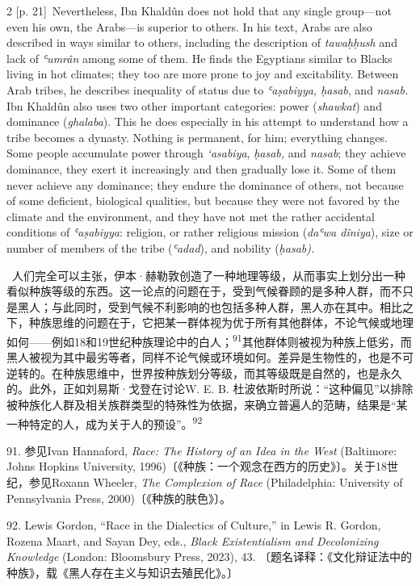 \documentclass[10pt,a4paper]{article}
\begin{document}
\begin{paracol}{2}
\switchcolumn
{\scriptsize\color{gray} [p. 21]}\ Nevertheless, Ibn Khaldûn does not hold that any single group—not even his own, the Arabs—is superior to others. In his text, Arabs are also described in ways similar to others, including the description of \textit{tawaḥḥush} and lack of \textit{ʿumrân} among some of them. He finds the Egyptians similar to Blacks living in hot climates; they too are more prone to joy and excitability. Between Arab tribes, he describes inequality of status due to \textit{ʿaṣabiyya, ḥasab}, and \textit{nasab.} Ibn Khaldûn also uses two other important categories: power (\textit{shawkat}) and dominance (\textit{ghalaba}). This he does especially in his attempt to understand how a tribe becomes a dynasty. Nothing is permanent, for him; everything changes. Some people accumulate power through \textit{`asabiya}, \textit{ḥasab,} and \textit{nasab}; they achieve dominance, they exert it increasingly and then gradually lose it. Some of them never achieve any dominance; they endure the dominance of others, not because of some deficient, biological qualities, but because they were not favored by the climate and the environment, and they have not met the rather accidental conditions of \textit{ʿaṣabiyya}: religion, or rather religious mission (\textit{daʿwa dîniya}), size or number of members of the tribe (\textit{ʿadad}), and nobility (\textit{ḥasab).}\par
\switchcolumn*
{\scriptsize\color{gray} [p. 22]}\ 人们完全可以主张，伊本·赫勒敦创造了一种地理等级，从而事实上划分出一种看似种族等级的东西。这一论点的问题在于，受到气候眷顾的是多种人群，而不只是黑人；与此同时，受到气候不利影响的也包括多种人群，黑人亦在其中。相比之下，种族思维的问题在于，它把某一群体视为优于所有其他群体，不论气候或地理如何——例如18和19世纪种族理论中的白人；\nobreak\textsuperscript{91}其他群体则被视为种族上低劣，而黑人被视为其中最劣等者，同样不论气候或环境如何。差异是生物性的，也是不可逆转的。在种族思维中，世界按种族划分等级，而其等级既是自然的，也是永久的。此外，正如刘易斯·戈登在讨论W. E. B. 杜波依斯时所说：“这种偏见”以排除被种族化人群及相关族群类型的特殊性为依据，来确立普遍人的范畴，结果是“某一种特定的人，成为关于人的预设”。\nobreak\textsuperscript{92}\par{\small 91. 参见Ivan Hannaford, \textit{Race: The History of an Idea in the West} (Baltimore: Johns Hopkins University, 1996)〔《种族：一个观念在西方的历史》〕。关于18世纪，参见Roxann Wheeler, \textit{The Complexion of Race} (Philadelphia: University of Pennsylvania Press, 2000)〔《种族的肤色》〕。\par}{\small 92. Lewis Gordon, “Race in the Dialectics of Culture,” in Lewis R. Gordon, Rozena Maart, and Sayan Dey, eds., \textit{Black Existentialism and Decolonizing Knowledge} (London: Bloomsbury Press, 2023), 43. 〔题名译释：《文化辩证法中的种族》，载《黑人存在主义与知识去殖民化》。〕\par}

\end{paracol}
\end{document}
